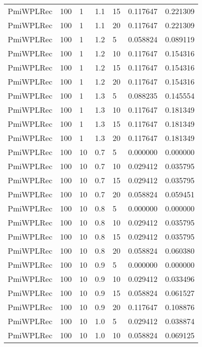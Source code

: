 \begin{tabular}{lllrlrr}
 PmiWPLRec &  100 &     1 &   1.1 &   15 &     0.117647 &  0.221309 \\
 PmiWPLRec &  100 &     1 &   1.1 &   20 &     0.117647 &  0.221309 \\
 PmiWPLRec &  100 &     1 &   1.2 &    5 &     0.058824 &  0.089119 \\
 PmiWPLRec &  100 &     1 &   1.2 &   10 &     0.117647 &  0.154316 \\
 PmiWPLRec &  100 &     1 &   1.2 &   15 &     0.117647 &  0.154316 \\
 PmiWPLRec &  100 &     1 &   1.2 &   20 &     0.117647 &  0.154316 \\
 PmiWPLRec &  100 &     1 &   1.3 &    5 &     0.088235 &  0.145554 \\
 PmiWPLRec &  100 &     1 &   1.3 &   10 &     0.117647 &  0.181349 \\
 PmiWPLRec &  100 &     1 &   1.3 &   15 &     0.117647 &  0.181349 \\
 PmiWPLRec &  100 &     1 &   1.3 &   20 &     0.117647 &  0.181349 \\
 PmiWPLRec &  100 &    10 &   0.7 &    5 &     0.000000 &  0.000000 \\
 PmiWPLRec &  100 &    10 &   0.7 &   10 &     0.029412 &  0.035795 \\
 PmiWPLRec &  100 &    10 &   0.7 &   15 &     0.029412 &  0.035795 \\
 PmiWPLRec &  100 &    10 &   0.7 &   20 &     0.058824 &  0.059451 \\
 PmiWPLRec &  100 &    10 &   0.8 &    5 &     0.000000 &  0.000000 \\
 PmiWPLRec &  100 &    10 &   0.8 &   10 &     0.029412 &  0.035795 \\
 PmiWPLRec &  100 &    10 &   0.8 &   15 &     0.029412 &  0.035795 \\
 PmiWPLRec &  100 &    10 &   0.8 &   20 &     0.058824 &  0.060380 \\
 PmiWPLRec &  100 &    10 &   0.9 &    5 &     0.000000 &  0.000000 \\
 PmiWPLRec &  100 &    10 &   0.9 &   10 &     0.029412 &  0.033496 \\
 PmiWPLRec &  100 &    10 &   0.9 &   15 &     0.058824 &  0.061527 \\
 PmiWPLRec &  100 &    10 &   0.9 &   20 &     0.117647 &  0.108876 \\
 PmiWPLRec &  100 &    10 &   1.0 &    5 &     0.029412 &  0.038874 \\
 PmiWPLRec &  100 &    10 &   1.0 &   10 &     0.058824 &  0.069125 \\

\end{tabular}
